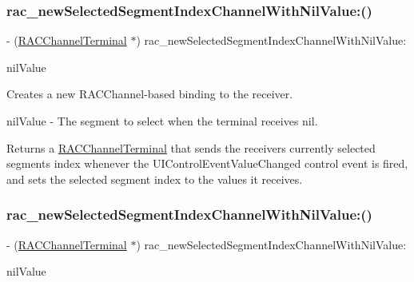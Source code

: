 \subsubsection{\texorpdfstring{rac\+\_\+new\+Selected\+Segment\+Index\+Channel\+With\+Nil\+Value\+:()}{rac\_newSelectedSegmentIndexChannelWithNilValue:()}\hspace{0.1cm}{\footnotesize\ttfamily [1/3]}}
{\footnotesize\ttfamily -\/ (\mbox{\hyperlink{interface_r_a_c_channel_terminal}{R\+A\+C\+Channel\+Terminal}} $\ast$) rac\+\_\+new\+Selected\+Segment\+Index\+Channel\+With\+Nil\+Value\+: \begin{DoxyParamCaption}\item[{(N\+S\+Number $\ast$)}]{nil\+Value }\end{DoxyParamCaption}}

Creates a new R\+A\+C\+Channel-\/based binding to the receiver.

nil\+Value -\/ The segment to select when the terminal receives {\ttfamily nil}.

Returns a \mbox{\hyperlink{interface_r_a_c_channel_terminal}{R\+A\+C\+Channel\+Terminal}} that sends the receiver\textquotesingle{}s currently selected segment\textquotesingle{}s index whenever the U\+I\+Control\+Event\+Value\+Changed control event is fired, and sets the selected segment index to the values it receives. \mbox{\label{category_u_i_segmented_control_07_r_a_c_signal_support_08_a94173e77e84791dae3e950b9c7b06bca}} 
\subsubsection{\texorpdfstring{rac\+\_\+new\+Selected\+Segment\+Index\+Channel\+With\+Nil\+Value\+:()}{rac\_newSelectedSegmentIndexChannelWithNilValue:()}\hspace{0.1cm}{\footnotesize\ttfamily [2/3]}}
{\footnotesize\ttfamily -\/ (\mbox{\hyperlink{interface_r_a_c_channel_terminal}{R\+A\+C\+Channel\+Terminal}} $\ast$) rac\+\_\+new\+Selected\+Segment\+Index\+Channel\+With\+Nil\+Value\+: \begin{DoxyParamCaption}\item[{(N\+S\+Number $\ast$)}]{nil\+Value }\end{DoxyParamCaption}}

